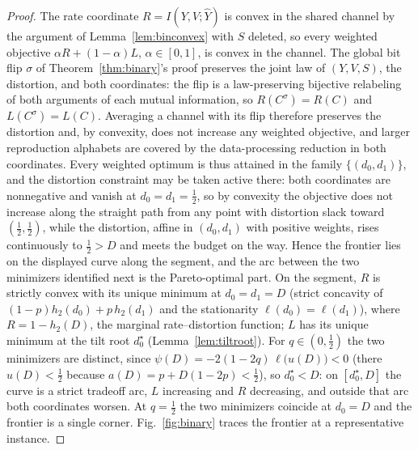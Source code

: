 \documentclass[11pt,onecolumn]{IEEEtran}
\newcommand{\hY}{\widehat{Y}}
\begin{document}
\begin{proof}
The rate
coordinate $R=I(Y,V;\hY)$ is convex in the shared channel by the
argument of Lemma~\ref{lem:binconvex} with $S$ deleted, so
every weighted objective $\alpha R+(1-\alpha)L$, $\alpha\in[0,1]$, is
convex in the channel. The global bit flip $\sigma$ of
Theorem~\ref{thm:binary}'s proof preserves the joint law of $(Y,V,S)$,
the distortion, and both coordinates: the flip is a law-preserving
bijective relabeling of both arguments of each mutual information, so
$R(C^\sigma)=R(C)$ and $L(C^\sigma)=L(C)$. Averaging a channel with its
flip therefore preserves the distortion and, by convexity, does not
increase any weighted objective, and larger reproduction alphabets are
covered by the data-processing reduction in both coordinates. Every
weighted optimum is thus attained in the family $\{(d_0,d_1)\}$, and
the distortion constraint may be taken active there: both coordinates
are nonnegative and vanish at $d_0=d_1=\tfrac12$, so by convexity the
objective does not increase along the straight path from any point
with distortion slack toward $(\tfrac12,\tfrac12)$, while the
distortion, affine in $(d_0,d_1)$ with positive weights, rises
continuously to $\tfrac12>D$ and meets the budget on the way. Hence the
frontier lies on the displayed curve along the segment, and the arc
between the two minimizers identified next is the Pareto-optimal part. On the segment, $R$ is strictly convex
with its unique minimum at $d_0=d_1=D$ (strict concavity of
$(1-p)h_2(d_0)+p\,h_2(d_1)$ and the stationarity
$\ell(d_0)=\ell(d_1)$), where $R=1-h_2(D)$, the marginal
rate--distortion function; $L$ has its unique minimum at the tilt root
$d_0^\star$ (Lemma~\ref{lem:tiltroot}). For $q\in(0,\tfrac12)$ the two
minimizers are distinct, since
$\psi(D)=-2(1-2q)\,\ell\bigl(u(D)\bigr)<0$ (there $u(D)<\tfrac12$
because $a(D)=p+D(1-2p)<\tfrac12$), so $d_0^\star<D$: on
$[d_0^\star,D]$ the curve is a strict tradeoff arc, $L$ increasing and
$R$ decreasing, and outside that arc both coordinates worsen. At
$q=\tfrac12$ the two minimizers coincide at $d_0=D$ and the frontier
is a single corner. Fig.~\ref{fig:binary} traces the frontier at a
representative instance.
\end{proof}
\end{document}
